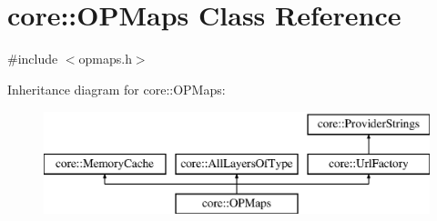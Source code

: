 \hypertarget{classcore_1_1_o_p_maps}{\section{core\-:\-:\-O\-P\-Maps \-Class \-Reference}
\label{classcore_1_1_o_p_maps}
}


{\ttfamily \#include $<$opmaps.\-h$>$}

\-Inheritance diagram for core\-:\-:\-O\-P\-Maps\-:\begin{figure}[H]
\begin{center}
\leavevmode
\includegraphics[height=3.000000cm]{classcore_1_1_o_p_maps}
\end{center}
\end{figure}
